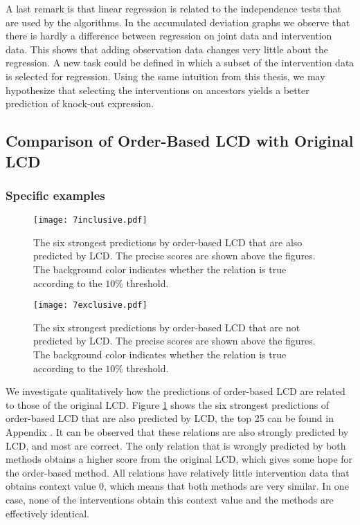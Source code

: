 A last remark is that linear regression is related to the independence tests that are used by the algorithms. In the accumulated deviation graphs we observe that there is hardly a difference between regression on joint data and intervention data. This shows that adding observation data changes very little about the regression. A new task could be defined in which a subset of the intervention data is selected for regression. Using the same intuition from this thesis, we may hypothesize that selecting the interventions on ancestors yields a better prediction of knock-out expression.



\subsection{Comparison of Order-Based LCD with Original LCD}

\subsubsection{Specific examples}


\begin{figure}[p]
    \centering
    \texttt{[image: 7inclusive.pdf]}
    \caption{The six strongest predictions by order-based LCD that are also predicted by LCD. The precise scores are shown above the figures. The background color indicates whether the relation is true according to the $10\%$ threshold.}
    \label{fig:7:exincl}
\end{figure}

\begin{figure}[p]
    \centering
    \texttt{[image: 7exclusive.pdf]}
    \caption{The six strongest predictions by order-based LCD that are not predicted by LCD. The precise scores are shown above the figures. The background color indicates whether the relation is true according to the $10\%$ threshold.}
    \label{fig:7:exexcl}
\end{figure}

We investigate qualitatively how the predictions of order-based LCD are related to those of the original LCD. Figure \ref{fig:7:exincl} shows the six strongest predictions of order-based LCD that are also predicted by LCD, the top 25 can be found in Appendix . It can be observed that these relations are also strongly predicted by LCD, and most are correct. The only relation that is wrongly predicted by both methods obtains a higher score from the original LCD, which gives some hope for the order-based method. All relations have relatively little intervention data that obtains context value $0$, which means that both methods are very similar. In one case, none of the interventions obtain this context value and the methods are effectively identical. 

